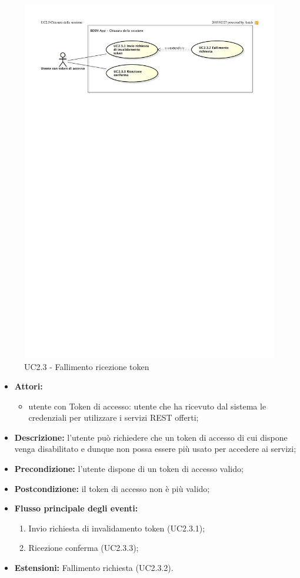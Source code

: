 \begin{figure}[htbp]
	\centering
	\centerline{\includegraphics {./images/UC2_3.pdf}} %
	\caption{UC2.3 - Fallimento ricezione token}
\end{figure}

\begin{itemize}
	\item \textbf{Attori:}
	\begin{itemize}
		\item utente con Token di accesso: utente che ha ricevuto dal sistema le credenziali per utilizzare i servizi REST offerti;
	\end{itemize}
	\item \textbf{Descrizione:} l'utente può richiedere che un token di accesso di cui dispone venga disabilitato e dunque non possa essere più usato per accedere ai servizi;
	\item \textbf{Precondizione:} l'utente dispone di un token di accesso valido;
	\item \textbf{Postcondizione:} il token di accesso non è più valido;
	\item \textbf{Flusso principale degli eventi:}
	\begin{enumerate}
		\item Invio richiesta di invalidamento token (UC2.3.1);
		\item Ricezione conferma (UC2.3.3);
	\end{enumerate}
	\item \textbf{Estensioni:} Fallimento richiesta (UC2.3.2).
\end{itemize}


